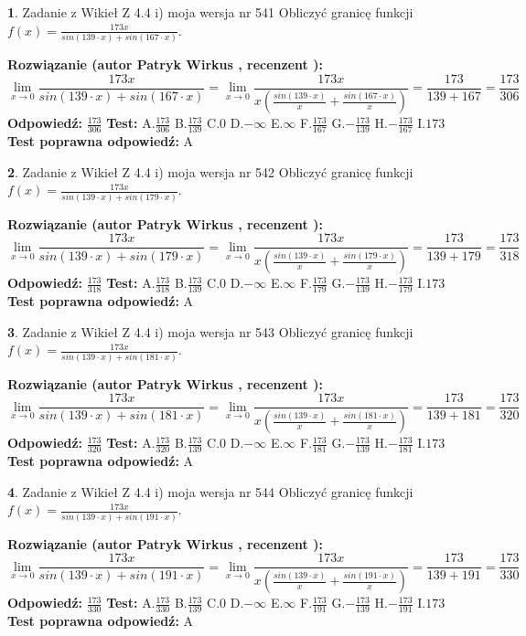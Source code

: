 \documentclass[12pt, a4paper]{article}
\theoremstyle{definition} %
\newtheorem{zad}{}
\newcommand{\zadStart}[1]{\begin{zad}#1\newline}
\newcommand{\zadStop}{\end{zad}}
\newcommand{\rozwStart}[2]{\noindent \textbf{Rozwiązanie (autor #1 , recenzent #2): }\newline}
\newcommand{\rozwStop}{\newline}
\newcommand{\odpStart}{\noindent \textbf{Odpowiedź:}\newline}
\newcommand{\odpStop}{\newline}
\newcommand{\testStart}{\noindent \textbf{Test:}\newline}
\newcommand{\testStop}{\newline}
\newcommand{\kluczStart}{\noindent \textbf{Test poprawna odpowiedź:}\newline}
\newcommand{\kluczStop}{\newline}
\begin{document}
\zadStart{Zadanie z Wikieł Z 4.4 i) moja wersja nr 541}
Obliczyć granicę funkcji $f(x)=\frac{173x}{sin(139\cdot x) +sin(167\cdot x)}$.
\zadStop
\rozwStart{Patryk Wirkus}{}
$$\lim\limits_{x\to 0}\frac{173x}{sin(139\cdot x) +sin(167\cdot x)}=\lim\limits_{x\to 0}\frac{173x}{x(\frac{sin(139\cdot x)}{x}+\frac{sin(167\cdot x)}{x})}=\frac{173}{139+167} = \frac{173}{306}$$
\rozwStop
\odpStart
$\frac{173}{306}$
\odpStop
\testStart
A.$\frac{173}{306}$
B.$\frac{173}{139}$
C.$0$
D.$-\infty$
E.$\infty$
F.$\frac{173}{167}$
G.$-\frac{173}{139}$
H.$-\frac{173}{167}$
I.$173$
\testStop
\kluczStart
A
\kluczStop



\zadStart{Zadanie z Wikieł Z 4.4 i) moja wersja nr 542}
Obliczyć granicę funkcji $f(x)=\frac{173x}{sin(139\cdot x) +sin(179\cdot x)}$.
\zadStop
\rozwStart{Patryk Wirkus}{}
$$\lim\limits_{x\to 0}\frac{173x}{sin(139\cdot x) +sin(179\cdot x)}=\lim\limits_{x\to 0}\frac{173x}{x(\frac{sin(139\cdot x)}{x}+\frac{sin(179\cdot x)}{x})}=\frac{173}{139+179} = \frac{173}{318}$$
\rozwStop
\odpStart
$\frac{173}{318}$
\odpStop
\testStart
A.$\frac{173}{318}$
B.$\frac{173}{139}$
C.$0$
D.$-\infty$
E.$\infty$
F.$\frac{173}{179}$
G.$-\frac{173}{139}$
H.$-\frac{173}{179}$
I.$173$
\testStop
\kluczStart
A
\kluczStop



\zadStart{Zadanie z Wikieł Z 4.4 i) moja wersja nr 543}
Obliczyć granicę funkcji $f(x)=\frac{173x}{sin(139\cdot x) +sin(181\cdot x)}$.
\zadStop
\rozwStart{Patryk Wirkus}{}
$$\lim\limits_{x\to 0}\frac{173x}{sin(139\cdot x) +sin(181\cdot x)}=\lim\limits_{x\to 0}\frac{173x}{x(\frac{sin(139\cdot x)}{x}+\frac{sin(181\cdot x)}{x})}=\frac{173}{139+181} = \frac{173}{320}$$
\rozwStop
\odpStart
$\frac{173}{320}$
\odpStop
\testStart
A.$\frac{173}{320}$
B.$\frac{173}{139}$
C.$0$
D.$-\infty$
E.$\infty$
F.$\frac{173}{181}$
G.$-\frac{173}{139}$
H.$-\frac{173}{181}$
I.$173$
\testStop
\kluczStart
A
\kluczStop



\zadStart{Zadanie z Wikieł Z 4.4 i) moja wersja nr 544}
Obliczyć granicę funkcji $f(x)=\frac{173x}{sin(139\cdot x) +sin(191\cdot x)}$.
\zadStop
\rozwStart{Patryk Wirkus}{}
$$\lim\limits_{x\to 0}\frac{173x}{sin(139\cdot x) +sin(191\cdot x)}=\lim\limits_{x\to 0}\frac{173x}{x(\frac{sin(139\cdot x)}{x}+\frac{sin(191\cdot x)}{x})}=\frac{173}{139+191} = \frac{173}{330}$$
\rozwStop
\odpStart
$\frac{173}{330}$
\odpStop
\testStart
A.$\frac{173}{330}$
B.$\frac{173}{139}$
C.$0$
D.$-\infty$
E.$\infty$
F.$\frac{173}{191}$
G.$-\frac{173}{139}$
H.$-\frac{173}{191}$
I.$173$
\testStop
\kluczStart
A
\kluczStop
\end{document}
